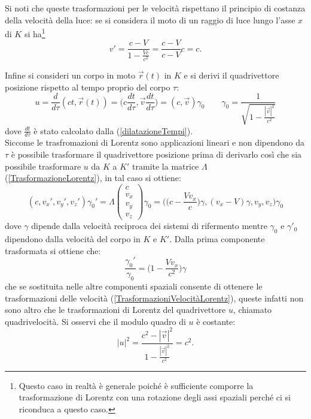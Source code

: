 Si noti che queste trasformazioni per le velocità rispettano il principio di costanza della velocità della luce: se si considera il moto di un raggio di luce lungo l'asse $x$ di $K$ si ha\footnote{Questo caso in realtà è generale poiché è sufficiente comporre la trasformazione di Lorentz con una rotazione degli assi spaziali perché ci si riconduca a questo caso.} 
\begin{equation*}
    v'=\frac{c-V}{1-\frac{Vc}{c^2}}=\frac{c-V}{c-V}c=c.
\end{equation*}

Infine si consideri un corpo in moto $\vec r(t)$ in $K$ e si derivi il quadrivettore posizione rispetto al tempo proprio del corpo $\tau$:
\begin{equation}
    u=\frac{d }{d\tau}(ct,\vec r(t))=\bigg(c\frac{dt}{d\tau},\vec v\frac{dt}{d\tau}\bigg)=(c,\vec v)\gamma_0 \qquad \gamma_0=\frac{1}{\sqrt{1-\frac{|\vec v|^2}{c^2}}}
    \label{defQuadrivelocità}
\end{equation}
dove $\frac{dt}{d\tau}$ è stato calcolato dalla (\ref{dilatazioneTempi}).\\
Siccome le trasfromazioni di Lorentz sono applicazioni lineari e non dipendono da $\tau$ è possibile trasformare il quadrivettore posizione prima di derivarlo così che sia possibile trasformare $u$ da $K$ a $K'$ tramite la matrice $\Lambda$ (\ref{TrasformazioneLorentz}), in tal caso si ottiene:
\begin{equation*}
       (c,  v_x',  v_y', v_z')\gamma_0'=\Lambda    
    \begin{pmatrix}
        c \\ v_x \\ v_y \\ v_z
     \end{pmatrix}\gamma_0=\bigg(\bigg(c-\frac{Vv_x}{c}\bigg)\gamma, (v_x-V)\gamma, v_y,  v_z\bigg)\gamma_0
\end{equation*}
dove $\gamma$ dipende dalla velocità reciproca dei sistemi di rifermento mentre $\gamma_0$ e $\gamma'_0$ dipendono dalla velocità del corpo in $K$ e $K'$. Dalla prima componente trasformata si ottiene che:
\begin{equation}
    \frac{\gamma_0'}{\gamma_0}=\bigg(1-\frac{Vv_x}{c^2}\bigg)\gamma
\end{equation}
che se sostituita nelle altre componenti spaziali consente di ottenere le trasformazioni delle velocità (\ref{TrasformazioniVelocitàLorentz}), queste infatti non sono altro che le trasformazioni di Lorentz del quadrivettore $u$, chiamato quadrivelocità. Si osservi che il modulo quadro di $u$ è costante:
\begin{equation*}
    |u|^2=\frac{c^2-|\vec v|^2}{1-\frac{|\vec v|^2}{c^2}}=c^2.
\end{equation*} 